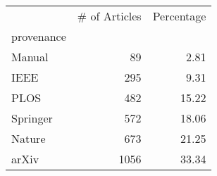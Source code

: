 \begin{tabular}{lrr}
\toprule
{} &  \# of Articles &  Percentage \\
provenance &                &             \\
\midrule
Manual     &             89 &        2.81 \\
IEEE       &            295 &        9.31 \\
PLOS       &            482 &       15.22 \\
Springer   &            572 &       18.06 \\
Nature     &            673 &       21.25 \\
arXiv      &           1056 &       33.34 \\
\bottomrule
\end{tabular}

